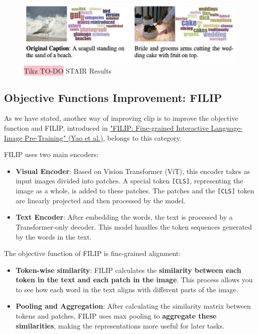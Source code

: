 \begin{figure}[!htbp]
    \centering
    \includegraphics[width=0.8\linewidth]{tikz/chapter11 - STAIR Results.png}
    \caption{{\color{red}\colorbox{pink}{Tikz TO-DO}} STAIR Results}
\end{figure}



\subsection{Objective Functions Improvement: FILIP}

As we have stated, another way of improving clip is to improve the objective function and FILIP, introduced in \href{https://arxiv.org/pdf/2111.07783}{"FILIP: Fine-grained Interactive Language-Image Pre-Training" (Yao et al.)}, belongs to this category. 

FILIP uses two main encoders:
\begin{itemize}
    \item \textbf{Visual Encoder}: Based on Vision Transformer (ViT), this encoder takes as input images divided into patches. A special token \texttt{[CLS]}, representing the image as a whole, is added to these patches. The patches and the \texttt{[CLS]} token are linearly projected and then processed by the model.
    \item \textbf{Text Encoder}: After embedding the words, the text is processed by a Transformer-only decoder. This model handles the token sequences generated by the words in the text.
\end{itemize}


The objective function of FILIP is fine-grained alignment:
\begin{itemize}
    \item \textbf{Token-wise similarity}: FILIP calculates the \textbf{similarity between each token in the text and each patch in the image}. This process allows you to see how each word in the text aligns with different parts of the image.
    \item \textbf{Pooling and Aggregation}: After calculating the similarity matrix between tokens and patches, FILIP uses max pooling to \textbf{aggregate these similarities}, making the representations more useful for later tasks.
\end{itemize}

